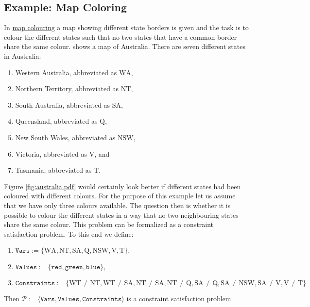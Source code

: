 \subsection{Example: Map Coloring}
In \href{https://en.wikipedia.org/wiki/Four_color_theorem}{map colouring} a map showing different state
borders is given and the task is to colour the different states such that no two states that have a common
border share the same colour.   shows a map of Australia.  There are seven different
states in Australia:
\begin{enumerate}
\item Western Australia, abbreviated as $\mathrm{WA}$,
\item Northern Territory, abbreviated as $\mathrm{NT}$,
\item South Australia, abbreviated as $\mathrm{SA}$,
\item Queensland, abbreviated as $\mathrm{Q}$,
\item New South Wales, abbreviated as $\mathrm{NSW}$,
\item Victoria, abbreviated as $\mathrm{V}$, and
\item Tasmania, abbreviated as $\mathrm{T}$.
\end{enumerate}
Figure \ref{fig:australia.pdf} would certainly look better if different states had been coloured with different
colours.  For the purpose of 
this example let us assume that we have only three colours available.  The question then is whether it is 
possible to colour the different states in a way that no two neighbouring states share the same colour.  This
problem can be formalized as a constraint satisfaction problem.  To this end we define:
\begin{enumerate}
\item $\mathtt{Vars} := \{ \mathrm{WA}, \mathrm{NT}, \mathrm{SA}, \mathrm{Q}, \mathrm{NSW}, \mathrm{V}, \mathrm{T} \}$,
\item $\mathtt{Values} := \{ \mathtt{red}, \mathtt{green}, \mathtt{blue} \}$,
\item $\mathtt{Constraints} := 
         \bigl\{ \mathrm{WT} \not= \mathrm{NT}, \mathrm{WT} \not= \mathrm{SA},
                 \mathrm{NT} \not= \mathrm{SA}, \mathrm{NT} \not= \mathrm{Q},
                 \mathrm{SA} \not= \mathrm{Q}, \mathrm{SA} \not= \mathrm{NSW}, \mathrm{SA} \not= \mathrm{V}, 
                 \mathrm{V} \not = \mathrm{T}
         \bigr\}
        $
\end{enumerate}
Then $\mathcal{P} := \langle \mathtt{Vars}, \mathtt{Values}, \mathtt{Constraints} \rangle$ is a constraint satisfaction problem.  

